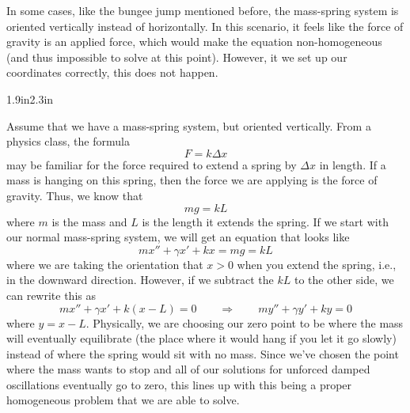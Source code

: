 In some cases, like the bungee jump mentioned before, the mass-spring system is oriented vertically instead of horizontally. In this scenario, it feels like the force of gravity is an applied force, which would make the equation non-homogeneous (and thus impossible to solve at this point). However, it we set up our coordinates correctly, this does not happen.

\begin{mywrapfigsimp}{1.9in}{2.3in}
\noindent
{}
\end{mywrapfigsimp}
Assume that we have a mass-spring system, but oriented vertically. From a physics class, the formula
\begin{equation*}
F = k \Delta x
\end{equation*}
may be familiar for the force required to extend a spring by $\Delta x$ in length. If a mass is hanging on this spring, then the force we are applying is the force of gravity. Thus, we know that
\begin{equation*}
mg = k L
\end{equation*} where $m$ is the mass and $L$ is the length it extends the spring. If we start with our normal mass-spring system, we will get an equation that looks like
\begin{equation*}
mx'' + \gamma x' + kx = mg = kL
\end{equation*}
where we are taking the orientation that $x > 0$ when you extend the spring, i.e., in the downward direction. However, if we subtract the $kL$ to the other side, we can rewrite this as
\begin{equation*}
mx'' + \gamma x' + k(x-L) = 0 \qquad \Rightarrow \qquad my'' + \gamma y' + ky = 0
\end{equation*}
where $y = x-L$. Physically, we are choosing our zero point to be where the mass will eventually equilibrate (the place where it would hang if you let it go slowly) instead of where the spring would sit with no mass. Since we've chosen the point where the mass wants to stop and all of our solutions for unforced damped oscillations eventually go to zero, this lines up with this being a proper homogeneous problem that we are able to solve.


